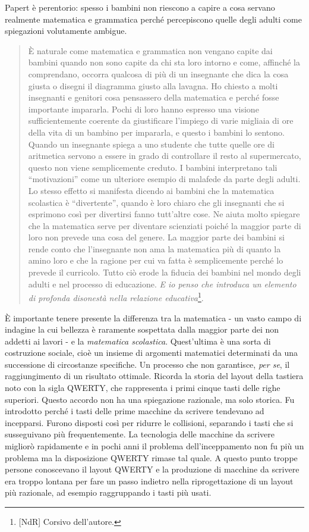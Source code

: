 Papert è perentorio: spesso i bambini non riescono a capire a cosa servano realmente matematica e grammatica perché percepiscono quelle degli adulti come spiegazioni volutamente ambigue.

\begin{quote}
È naturale come matematica e grammatica non vengano capite dai bambini quando non sono capite da chi sta loro intorno e come, affinché la comprendano, occorra qualcosa di più di un insegnante che dica la cosa giusta o disegni il diagramma giusto alla lavagna. Ho chiesto a molti insegnanti e genitori cosa pensassero della matematica e perché fosse importante impararla. Pochi di loro hanno espresso una visione sufficientemente coerente da giustificare l'impiego di varie migliaia di ore della vita di un bambino per impararla, e questo i bambini lo sentono. Quando un insegnante spiega a uno studente che tutte quelle ore di aritmetica servono a essere in grado di controllare il resto al supermercato, questo non viene semplicemente creduto. I bambini interpretano tali “motivazioni” come un ulteriore esempio di malafede da parte degli adulti. Lo stesso effetto si manifesta dicendo ai bambini che la matematica scolastica è “divertente”, quando è loro chiaro che gli insegnanti che si esprimono così per divertirsi fanno tutt'altre cose. Ne aiuta molto spiegare che la matematica serve per diventare scienziati poiché la maggior parte di loro non prevede una cosa del genere.  La maggior parte dei bambini si rende conto che l'insegnante non ama la matematica più di quanto la amino loro e che la ragione per cui va fatta è semplicemente perché lo prevede il curricolo. Tutto ciò erode la fiducia dei bambini nel mondo degli adulti e nel processo di educazione. \textit{E io penso che introduca un elemento di profonda disonestà nella relazione educativa}\footnote{[NdR] Corsivo dell'autore.}.
\end{quote}

È importante tenere presente la differenza tra la matematica - un vasto campo di indagine la cui bellezza è raramente sospettata dalla maggior parte dei non addetti ai lavori - e la \textit{matematica scolastica}. Quest'ultima è una sorta di costruzione sociale, cioè un insieme di argomenti matematici determinati da una successione di circostanze specifiche. Un processo che non garantisce, \textit{per se}, il raggiungimento di un risultato ottimale. Ricorda la storia del layout della tastiera noto con la sigla QWERTY, che rappresenta i primi cinque tasti delle righe superiori. Questo accordo non ha una spiegazione razionale, ma solo storica. Fu introdotto perché i tasti delle prime macchine da scrivere tendevano ad incepparsi. Furono disposti così per ridurre le collisioni, separando i tasti che si susseguivano più frequentemente. La tecnologia delle macchine da scrivere migliorò rapidamente e in pochi anni il problema dell'inceppamento non fu più un problema ma la disposizione QWERTY rimase tal quale. A questo punto troppe persone conoscevano il layout QWERTY e la produzione di macchine da scrivere era troppo lontana per fare un passo indietro nella riprogettazione di un layout più razionale, ad esempio raggruppando i tasti più usati. 

